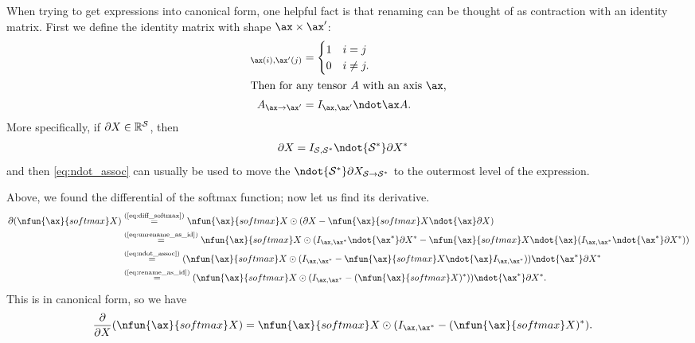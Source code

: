 When trying to get expressions into canonical form, one helpful fact is that
renaming can be thought of as contraction with an identity matrix. First we define the identity matrix with shape $\ax \times \ax'$:
\begin{align}
[I_{\ax,\ax'}]_{\ax(i),\ax'(j)} &= \begin{cases} 1 & i = j \\ 0 & i \neq j. \end{cases} \notag \\
\intertext{Then for any tensor $A$ with an axis $\ax$,}
A_{\ax\rightarrow\ax'} &= I_{\ax,\ax'} \ndot\ax A. 
\label{eq:rename_as_id}
\end{align}
More specifically, if $\partial X \in \mathbb{R}^\mathcal{S}$, then
\begin{align}
\partial X &= I_{\mathcal{S},\mathcal{S}\inax} \ndot{\mathcal{S}\inax} \partial X\inax \label{eq:unrename_as_id}
\end{align}
and then \cref{eq:ndot_assoc} can usually be used to move the ${}\ndot{\mathcal{S}\inax} \partial X_{\mathcal{S}\rightarrow\mathcal{S}\inax}$ to the outermost level of the expression.

Above, we found the differential of the softmax function; now let us find its derivative.
\begin{align*}
\partial (\nfun{\ax}{softmax} X) 
&\eqby{eq:diff_softmax} \nfun{\ax}{softmax} X \odot (\partial X - \nfun{\ax}{softmax} X \ndot{\ax} \partial X) \\
&\eqby{eq:unrename_as_id} \nfun{\ax}{softmax} X \odot (I_{\ax,\ax\inax} \ndot{\ax\inax} \partial X\inax - \nfun{\ax}{softmax} X \ndot{\ax} (I_{\ax,\ax\inax} \ndot{\ax\inax} \partial X\inax)) \\
&\eqby{eq:ndot_assoc} (\nfun{\ax}{softmax} X \odot (I_{\ax,\ax\inax} - \nfun{\ax}{softmax} X \ndot{\ax} I_{\ax,\ax\inax})) \ndot{\ax\inax} \partial X\inax \\
&\eqby{eq:rename_as_id} (\nfun{\ax}{softmax} X \odot (I_{\ax,\ax\inax} - (\nfun{\ax}{softmax} X)\inax)) \ndot{\ax\inax} \partial X\inax.
\end{align*}
This is in canonical form, so we have
\begin{align}
\frac{\partial}{\partial X} (\nfun{\ax}{softmax} X) &= \nfun{\ax}{softmax} X \odot (I_{\ax,\ax\inax} - (\nfun{\ax}{softmax} X)\inax). \label{eq:deriv_softmax}
\end{align}

\subsection{\LiftingNN}

